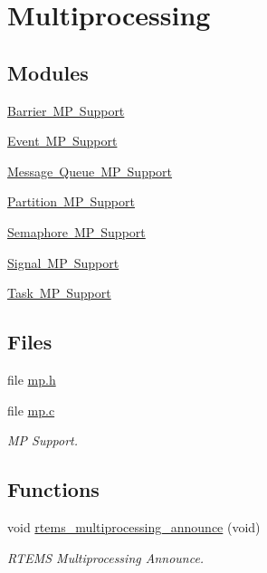 \hypertarget{group__ClassicMP}{}\section{Multiprocessing}
\label{group__ClassicMP}
\subsection*{Modules}
\begin{DoxyCompactItemize}
\item 
\mbox{\hyperlink{group__ClassicBarrierMP}{Barrier M\+P Support}}
\item 
\mbox{\hyperlink{group__ClassicEventMP}{Event M\+P Support}}
\item 
\mbox{\hyperlink{group__ClassicMsgMP}{Message Queue M\+P Support}}
\item 
\mbox{\hyperlink{group__ClassicPartMP}{Partition M\+P Support}}
\item 
\mbox{\hyperlink{group__ClassicSEM}{Semaphore M\+P Support}}
\item 
\mbox{\hyperlink{group__ClassicSignalMP}{Signal M\+P Support}}
\item 
\mbox{\hyperlink{group__ClassicTaskMP}{Task M\+P Support}}
\end{DoxyCompactItemize}
\subsection*{Files}
\begin{DoxyCompactItemize}
\item 
file \mbox{\hyperlink{mp_8h}{mp.\+h}}
\item 
file \mbox{\hyperlink{mp_8c}{mp.\+c}}
\begin{DoxyCompactList}\small\item\em MP Support. \end{DoxyCompactList}\end{DoxyCompactItemize}
\subsection*{Functions}
\begin{DoxyCompactItemize}
\item 
void \mbox{\hyperlink{group__ClassicMP_ga2dacfadddfd9155a1e2f7d4230ac00e0}{rtems\+\_\+multiprocessing\+\_\+announce}} (void)
\begin{DoxyCompactList}\small\item\em R\+T\+E\+MS Multiprocessing Announce. \end{DoxyCompactList}\end{DoxyCompactItemize}


